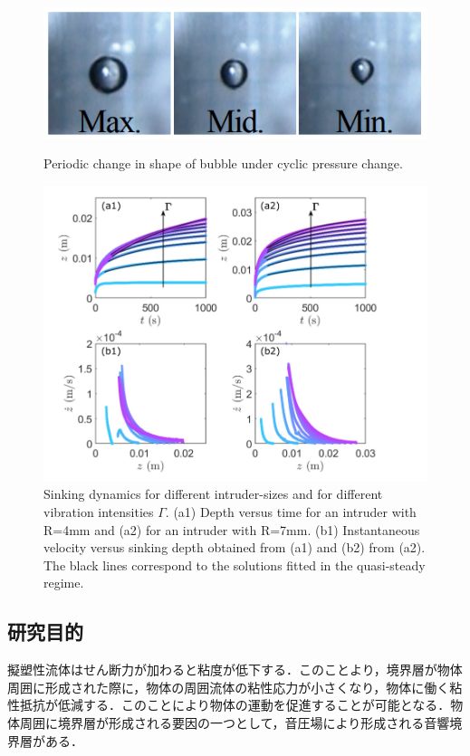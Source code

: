 \begin{center}
    \begin{figure}[h]
        \centering
        \includegraphics[width=12.0cm,clip]{1-Background/3-bubble.png}
        \caption{Periodic change in shape of bubble under cyclic pressure change\cite{ref:5}.}
        \label{fig:3-bubble}
        \centering
        \includegraphics[width=12.0cm,clip]{1-Background/4-sinking.png}
        \caption{Sinking dynamics for different intruder-sizes and for different vibration intensities $\Gamma$. (a1) Depth versus time for an intruder with R=4mm and (a2) for an intruder with R=7mm. (b1) Instantaneous velocity versus sinking depth obtained from (a1) and (b2) from (a2). The black lines correspond to the solutions fitted in the quasi-steady regime\cite{ref:6}.}
        \label{fig:4-sinking}
    \end{figure}
\end{center}

\subsection{研究目的}

擬塑性流体はせん断力が加わると粘度が低下する．このことより，境界層が物体周囲に形成された際に，物体の周囲流体の粘性応力が小さくなり，物体に働く粘性抵抗が低減する．このことにより物体の運動を促進することが可能となる．物体周囲に境界層が形成される要因の一つとして，音圧場により形成される音響境界層がある\cite{ref:7}．

